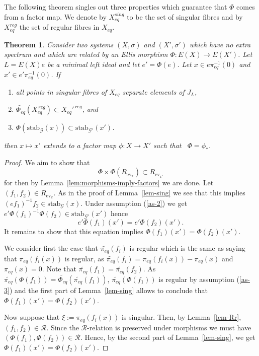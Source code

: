 \documentclass[10pt,a4paper]{amsart}
\newtheorem{theorem}{Theorem}[section]
\numberwithin{equation}{section}
\newcommand{\Gg}{{\mathcal G}}
\newcommand{\Rr}{{\mathcal R}}
\newcommand{\Xe}{X_{eq}}
\newcommand{\pe}{\pi_{eq}}
\newcommand{\tpe}{\widetilde{\pe}}
\newcommand{\ev}{\mathrm{ev}}
\newcommand{\stab}{\mathrm{stab}}
\newcommand{\tPhe}{\widetilde{\Phi_{eq}}}
\begin{document}
The following theorem singles out three properties which guarantee that $\Phi$ comes from a factor map.  
We denote by $\Xe^{sing}$ to be the set of singular fibres and by $\Xe^{reg}$ the set of regular fibres in $\Xe$.
\begin{theorem}\label{thm-main} Consider two systems
$(X,\sigma)$ and $(X',\sigma')$ which have no extra spectrum and which are related by an 
Ellis morphism $\Phi:E(X)\rightarrow E(X')$. Let $L=E(X)e$ be a minimal left ideal and let $e'=\Phi(e)$. Let  $x\in e\pe^{-1}(0)$ and $x'\in e'\pe^{-1}(0)$. If
\begin{enumerate}
\item\label{as-1} all points in singular fibres of $\Xe$ separate elements of  $J_L$,
\item\label{as-3} $\tPhe ( \Xe^{\,reg}  ) \subset \Xe'^{\, reg}$, and
\item\label{as-2} $\Phi(\stab_{\Gg}(x))\subset \stab_{\Gg'}(x')$.
\end{enumerate}
then $x \mapsto x'$ extends to a factor map $\phi:X\to X'$ such that \ $\Phi=\phi_*$.  
\end{theorem}
\begin{proof}
We aim to show that  
$$\Phi\times\Phi (R_{\ev_{x}})\subset R_{\ev_{x'}}$$
for then by Lemma~\ref{lem:morphisms-imply-factors} we are done.
Let $(f_1,f_2)\in R_{\ev_{x}}$. %
As in the proof of  Lemma~\ref{lem-sing} we see that this implies $(ef_1)^{-1}f_2 \in \stab_{\Gg}(x)$. 
Under assumption (\ref{as-2}) %
we get $e'\Phi(f_1)^{-1}\Phi(f_2)\in {\stab_{\Gg'}(x')}$ %
hence
\begin{equation}\label{eq-1}
e'\Phi(f_1)(x')=e'\Phi(f_2)(x').
\end{equation}
It remains to show that this equation implies 
$\Phi(f_1)(x')=\Phi(f_2)(x')$. 


We consider first the case that $ \tpe(f_i)$ is regular which is the same as saying that  $\pe(f_i(x))$ is regular, as $ \tpe(f_i)= \pe(f_i(x))-\pe(x)$ and $\pe(x)=0$.
Note that $ \tpe(f_1)= \tpe(f_2)$. As 
$\tpe(\Phi(f_1))=\tPhe(\tpe(f_1))$, $\tpe(\Phi(f_1))$ is regular by assumption (\ref{as-3})
and the first part of Lemma~\ref{lem-sing} allows to conclude  
that $\Phi(f_1)(x')=\Phi(f_2)(x')$.

Now suppose that $\xi:= \pe(f_i(x))$ is singular. Then, 
by Lemma~\ref{lem-Rr}, $(f_1,f_2)\in \Rr$. Since the $\Rr$-relation is preserved under morphisms we must have $(\Phi(f_1),\Phi(f_2))\in\Rr$.
Hence, by the second part of Lemma~\ref{lem-sing}, we get $\Phi(f_1)(x')=\Phi(f_2)(x')$. 
\end{proof}
\end{document}
